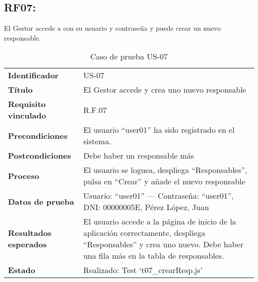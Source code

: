 \subsection*{RF07:} El Gestor accede a con su usuario y contraseña y puede crear un nuevo responsable.
\begin{table}[H]
	\centering
	\small
	\caption{Caso de prueba US-07}
	\label{tab:caso_us07}
	\begin{tabular}{>{\bfseries}l p{11cm}}
		Identificador & US-07 \\
		Título & El Gestor accede y crea uno nuevo responsable \\
		Requisito vinculado & R.F.07 \\
		Precondiciones & El usuario “user01” ha sido registrado en el sistema. \\
		Postcondiciones & Debe haber un responsable más \\
		Proceso & El usuario se loguea, despliega “Responsables”, pulsa en “Crear” y añade el nuevo responsable \\
		Datos de prueba & Usuario: “user01” — Contraseña: “user01”, DNI: 00000005E, Pérez López, Juan \\
		Resultados esperados & El usuario accede a la página de inicio de la aplicación correctamente, despliega “Responsables” y crea uno nuevo. Debe haber una fila más en la tabla de responsables. \\
		Estado & Realizado: Test `t07\_crearResp.js'\\
	\end{tabular}
\end{table}

